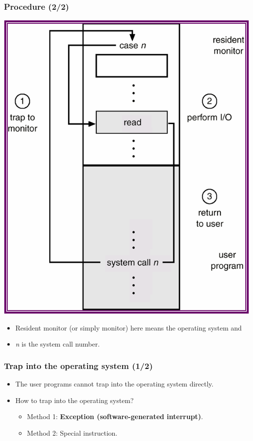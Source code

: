 \documentclass[CJKutf8,xcolor=pdftex,dvipsnames,table]{beamer}
\begin{document}
\begin{CJK*}{UTF8}{song}
  \begin{frame}
    \frametitle{Procedure (2/2)} \pause
    \begin{center}
      \includegraphics[scale=.4]{v6f2-8} \pause
    \end{center}
    \begin{itemize}
    \item{Resident monitor (or simply monitor) here means the operating system and} \pause
    \item{\emph{n} is the system call number.}
    \end{itemize}
  \end{frame}

  \begin{frame}
    \frametitle{Trap into the operating system (1/2)} \pause
    \begin{itemize}
    \item{The user programs cannot trap into the operating system directly.} \pause
    \item{How to trap into the operating system?} \pause
      \begin{itemize}
      \item{Method 1: \textbf{Exception (software-generated interrupt)}.} \pause
      \item{Method 2: Special instruction.}
      \end{itemize}
    \end{itemize}
  \end{frame}


\end{CJK*}
\end{document}
